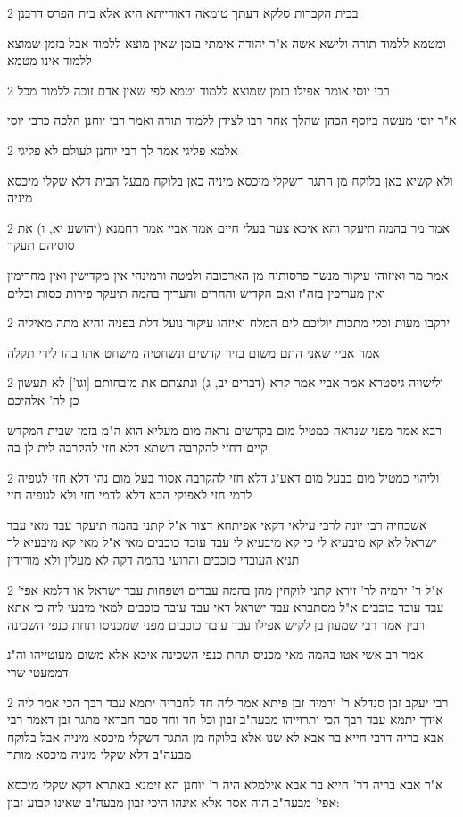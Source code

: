 \documentclass[12pt, openany]{book}
\newcommand{\sethebfont}{
\fontsize{10.5pt}{21.0pt} \selectfont
}
\newcommand{\twocol}[1]{
	{\sethebfont \begin{multicols}{2}
			#1
	\end{multicols}}	
}
\begin{document}
\twocol{בבית הקברות סלקא דעתך טומאה דאורייתא היא אלא בית הפרס דרבנן
\par ומטמא ללמוד תורה ולישא אשה א"ר יהודה אימתי בזמן שאין מוצא ללמוד אבל בזמן שמוצא ללמוד אינו מטמא}
\twocol{רבי יוסי אומר אפילו בזמן שמוצא ללמוד יטמא לפי שאין אדם זוכה ללמוד מכל
\par א"ר יוסי מעשה ביוסף הכהן שהלך אחר רבו לצידן ללמוד תורה ואמר רבי יוחנן הלכה כרבי יוסי}
\twocol{אלמא פליגי אמר לך רבי יוחנן לעולם לא פליגי
\par ולא קשיא כאן בלוקח מן התגר דשקלי מיכסא מיניה כאן בלוקח מבעל הבית דלא שקלי מיכסא מיניה}
\twocol{אמר מר בהמה תיעקר והא איכא צער בעלי חיים אמר אביי אמר רחמנא (יהושע יא, ו) את סוסיהם תעקר
\par אמר מר ואיזוהי עיקור מנשר פרסותיה מן הארכובה ולמטה ורמינהי אין מקדישין ואין מחרימין ואין מעריכין בזה"ז ואם הקדיש והחרים והעריך בהמה תיעקר פירות כסות וכלים}
\twocol{ירקבו מעות וכלי מתכות יוליכם לים המלח ואיזהו עיקור נועל דלת בפניה והיא מתה מאיליה
\par אמר אביי שאני התם משום בזיון קדשים ונשחטיה מישחט אתו בהו לידי תקלה}
\twocol{ולישויה גיסטרא אמר אביי אמר קרא (דברים יב, ג) ונתצתם את מזבחותם [וגו'] לא תעשון כן לה' אלהיכם
\par רבא אמר מפני שנראה כמטיל מום בקדשים נראה מום מעליא הוא ה"מ בזמן שבית המקדש קיים דחזי להקרבה השתא דלא חזי להקרבה לית לן בה}
\twocol{וליהוי כמטיל מום בבעל מום דאע"ג דלא חזי להקרבה אסור בעל מום נהי דלא חזי לגופיה לדמי חזי לאפוקי הכא דלא לדמי חזי ולא לגופיה חזי
\par אשכחיה רבי יונה לרבי עילאי דקאי אפיתחא דצור א"ל קתני בהמה תיעקר עבד מאי עבד ישראל לא קא מיבעיא לי כי קא מיבעיא לי עבד עובד כוכבים מאי א"ל מאי קא מיבעיא לך תניא העובדי כוכבים והרועי בהמה דקה לא מעלין ולא מורידין}
\twocol{א"ל ר' ירמיה לר' זירא קתני לוקחין מהן בהמה עבדים ושפחות עבד ישראל או דלמא אפי' עבד עובד כוכבים א"ל מסתברא עבד ישראל דאי עבד עובד כוכבים למאי מיבעי ליה כי אתא רבין אמר רבי שמעון בן לקיש אפילו עבד עובד כוכבים מפני שמכניסו תחת כנפי השכינה
\par אמר רב אשי אטו בהמה מאי מכניס תחת כנפי השכינה איכא אלא משום מעוטייהו וה"נ דממעטי שרי:}
\twocol{רבי יעקב זבן סנדלא ר' ירמיה זבן פיתא אמר ליה חד לחבריה יתמא עבד רבך הכי אמר ליה אידך יתמא עבד רבך הכי ותרוייהו מבעה"ב זבון וכל חד וחד סבר חבראי מתגר זבן דאמר רבי אבא בריה דרבי חייא בר אבא לא שנו אלא בלוקח מן התגר דשקלי מיכסא מיניה אבל בלוקח מבעה"ב דלא שקלי מיניה מיכסא מותר
\par א"ר אבא בריה דר' חייא בר אבא אילמלא היה ר' יוחנן הא זימנא באתרא דקא שקלי מיכסא אפי' מבעה"ב הוה אסר אלא אינהו היכי זבון מבעה"ב שאינו קבוע זבון:}
\end{document}
